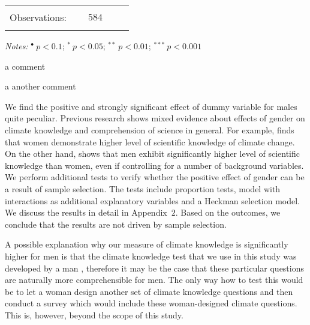 \documentclass[a4paper,12pt]{article}
\begin{document}
{\begin{threeparttable}
\begin{small}
\begin{tabular}{lclrlcl}
  \\
\hline
\vspace{-0.4cm} \\ Observations:&  \multicolumn{5}{c}{$584$} \\  \vspace{-0.4cm}
\\
\hline
\end{tabular} 
\end{small}
 \begin{tablenotes}
  \begin{footnotesize}
    \item \textit{Notes:} \hspace{0.15cm}$^{\bullet}~p<0.1$; $^{*}~p<0.05$; $^{**}~p<0.01$; $^{***}~p<0.001$
    \begin{adjustwidth}{1cm}{} \item a comment
    \item[a]another comment
     \end{adjustwidth}
\singlespacing
  \end{footnotesize}
\end{tablenotes}
  \end{threeparttable} 
\par}
\linespread{1}

\pagebreak

We find the positive and strongly significant effect of dummy variable for males quite peculiar. Previous research shows mixed evidence about effects of gender on climate knowledge and comprehension of science in general. For example, \citet{McCright2010} finds that women demonstrate higher level of scientific knowledge of climate change. On the other hand, \citet{Hayes2001gender} shows that men exhibit significantly higher level of scientific knowledge than women, even if controlling for a number of background variables. We perform additional tests to verify whether the positive effect of gender can be a result of sample selection. The tests include proportion tests, model with interactions as additional explanatory variables and a Heckman selection model. We discuss the results in detail in Appendix~$2$.  Based on the outcomes, we conclude that the results are not driven by sample selection.


A possible explanation why our measure of climate knowledge is significantly higher for men is that the climate knowledge test that we use in this study was developed by a man \citep{Kahan2015}, therefore it may be the case that these particular questions are naturally more comprehensible for men. The only way how to test this would be to let a woman design another set of climate knowledge questions and then conduct a survey which would include these woman-designed climate questions. This is, however, beyond the scope of this study.
\end{document}
